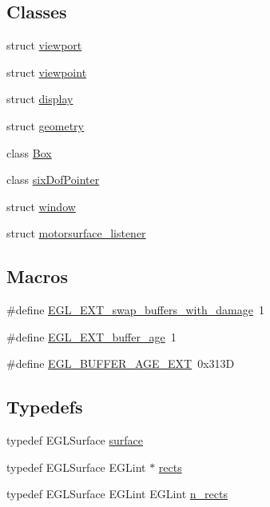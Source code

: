 \subsection*{Classes}
\begin{DoxyCompactItemize}
\item 
struct \hyperlink{structviewport}{viewport}
\item 
struct \hyperlink{structviewpoint}{viewpoint}
\item 
struct \hyperlink{structdisplay}{display}
\item 
struct \hyperlink{structgeometry}{geometry}
\item 
class \hyperlink{classBox}{Box}
\item 
class \hyperlink{classsixDofPointer}{six\-Dof\-Pointer}
\item 
struct \hyperlink{structwindow}{window}
\item 
struct \hyperlink{structmotorsurface__listener}{motorsurface\-\_\-listener}
\end{DoxyCompactItemize}
\subsection*{Macros}
\begin{DoxyCompactItemize}
\item 
\#define \hyperlink{simple-egl_8cpp_a083d37f289b99270e0391419178d458f}{E\-G\-L\-\_\-\-E\-X\-T\-\_\-swap\-\_\-buffers\-\_\-with\-\_\-damage}~1
\item 
\#define \hyperlink{simple-egl_8cpp_a0792e3d8b2bc978f95917a234b0c81df}{E\-G\-L\-\_\-\-E\-X\-T\-\_\-buffer\-\_\-age}~1
\item 
\#define \hyperlink{simple-egl_8cpp_a7045d8a6b4857f268a62fab2de2021fd}{E\-G\-L\-\_\-\-B\-U\-F\-F\-E\-R\-\_\-\-A\-G\-E\-\_\-\-E\-X\-T}~0x313\-D
\end{DoxyCompactItemize}
\subsection*{Typedefs}
\begin{DoxyCompactItemize}
\item 
typedef E\-G\-L\-Surface \hyperlink{simple-egl_8cpp_a0720952aa1caded45b5bcdce589663a9}{surface}
\item 
typedef E\-G\-L\-Surface E\-G\-Lint $\ast$ \hyperlink{simple-egl_8cpp_a56616f7ca3fc53c0da41d05de9330b11}{rects}
\item 
typedef E\-G\-L\-Surface E\-G\-Lint E\-G\-Lint \hyperlink{simple-egl_8cpp_aa6a11810244355f89e6c4961b9dd3b53}{n\-\_\-rects}
\end{DoxyCompactItemize}
